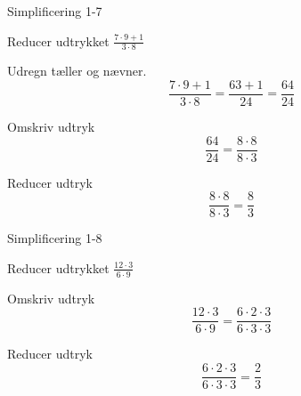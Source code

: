 \documentclass{article}
\begin{document}
\newpage

\begin{exercise}{Simplificering 1-7}
	
	Reducer udtrykket $\frac{7 \cdot 9 + 1}{3 \cdot 8}$
	
	
	\hint
	
	Udregn tæller og nævner.
	\[
	\frac{7 \cdot 9 + 1}{3 \cdot 8} = \frac{63+1}{24} = \frac{64}{24}
	\]
	
	\hint

	Omskriv udtryk 
	\[
	\frac{64}{24} = \frac{8 \cdot 8}{8 \cdot 3}
	\]	
	
	\hint
	
	Reducer udtryk 
	\[
	\frac{8 \cdot 8}{8 \cdot 3} = \frac{8}{3}
	\]
	
\end{exercise}

\newpage

\begin{exercise}{Simplificering 1-8}
	
	Reducer udtrykket $\frac{12 \cdot 3}{6 \cdot 9}$


	\hint

	Omskriv udtryk
	\[
	\frac{12 \cdot 3}{6 \cdot 9} = \frac{6 \cdot 2 \cdot 3}{ 6 \cdot 3 \cdot 3}
	\]
	
	\hint

	Reducer udtryk 
	\[
	 \frac{6 \cdot 2 \cdot 3}{6 \cdot 3 \cdot 3} = \frac{2}{3} 
	\]
	
\end{exercise}
\end{document}

